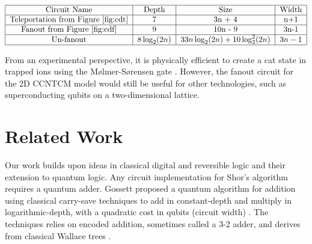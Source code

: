 \begin{table}
\begin{displaymath}
\begin{tabular}{|c|c|c|c|}
\hline
\text{Circuit Name} & \text{Depth} & \text{Size} & \text{Width}\\
\hline
\text{Teleportation from Figure \ref{fig:cdt}} & 7 & 3n + 4 & n+1\\
\hline
\text{Fanout from Figure \ref{fig:cdf}} & 9 & 10n - 9 & 3n-1 \\
\hline
\text{Un-fanout} & $8\log_2(2n)$ & $33n\log_2(2n) + 10\log^2_2(2n)$ & $3n-1$ \\
\hline
\end{tabular}
\end{displaymath}
\centerline{}
\label{tab:cd-resources}
\end{table}

From an experimental perspective, it is physically efficient to create
a cat state in trapped ions using the M{\o}lmer-S{\o}rensen gate
\cite{Sorensen2000}\cite{Benhelm2008}. However, the fanout circuit for
the 2D CCNTCM model would still be useful for other technologies, such
as superconducting qubits on a two-dimensional lattice.


%
\section{Related Work}
\label{sec:related}

Our work builds upon ideas in classical digital and reversible logic and their extension to quantum logic.
Any circuit implementation for Shor's algorithm requires a quantum adder.
Gossett proposed a quantum algorithm for addition using classical carry-save techniques to add
in constant-depth and multiply in logarithmic-depth, with a quadratic
cost in qubits (circuit width) \cite{Gossett1998}. The techniques relies on encoded addition, sometimes
called a 3-2 adder, and derives from classical Wallace trees \cite{Wallace1964}.

